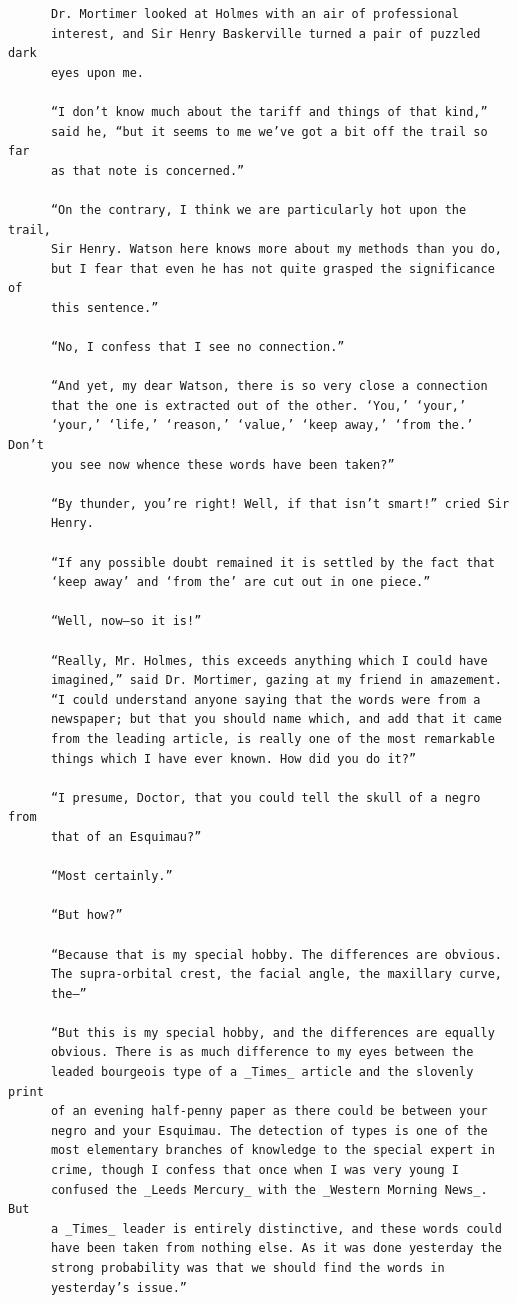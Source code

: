 \documentclass{article}
\begin{document}
\begin{verbatim}
      Dr. Mortimer looked at Holmes with an air of professional
      interest, and Sir Henry Baskerville turned a pair of puzzled dark
      eyes upon me.

      “I don’t know much about the tariff and things of that kind,”
      said he, “but it seems to me we’ve got a bit off the trail so far
      as that note is concerned.”

      “On the contrary, I think we are particularly hot upon the trail,
      Sir Henry. Watson here knows more about my methods than you do,
      but I fear that even he has not quite grasped the significance of
      this sentence.”

      “No, I confess that I see no connection.”

      “And yet, my dear Watson, there is so very close a connection
      that the one is extracted out of the other. ‘You,’ ‘your,’
      ‘your,’ ‘life,’ ‘reason,’ ‘value,’ ‘keep away,’ ‘from the.’ Don’t
      you see now whence these words have been taken?”

      “By thunder, you’re right! Well, if that isn’t smart!” cried Sir
      Henry.

      “If any possible doubt remained it is settled by the fact that
      ‘keep away’ and ‘from the’ are cut out in one piece.”

      “Well, now—so it is!”

      “Really, Mr. Holmes, this exceeds anything which I could have
      imagined,” said Dr. Mortimer, gazing at my friend in amazement.
      “I could understand anyone saying that the words were from a
      newspaper; but that you should name which, and add that it came
      from the leading article, is really one of the most remarkable
      things which I have ever known. How did you do it?”

      “I presume, Doctor, that you could tell the skull of a negro from
      that of an Esquimau?”

      “Most certainly.”

      “But how?”

      “Because that is my special hobby. The differences are obvious.
      The supra-orbital crest, the facial angle, the maxillary curve,
      the—”

      “But this is my special hobby, and the differences are equally
      obvious. There is as much difference to my eyes between the
      leaded bourgeois type of a _Times_ article and the slovenly print
      of an evening half-penny paper as there could be between your
      negro and your Esquimau. The detection of types is one of the
      most elementary branches of knowledge to the special expert in
      crime, though I confess that once when I was very young I
      confused the _Leeds Mercury_ with the _Western Morning News_. But
      a _Times_ leader is entirely distinctive, and these words could
      have been taken from nothing else. As it was done yesterday the
      strong probability was that we should find the words in
      yesterday’s issue.”


\end{verbatim}
\end{document}
